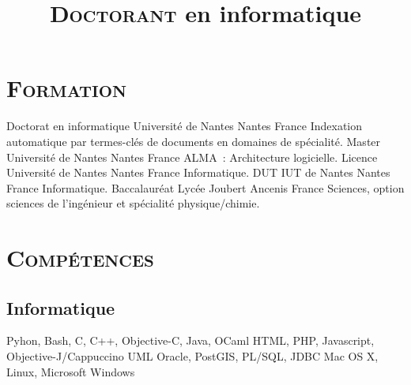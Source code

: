 \documentclass[10pt, a4paper]{moderncv}
\title{\Large{\textsc{Doctorant}} \large{en informatique}}
\begin{document}
  \maketitle

  \section{\textsc{Formation}}
            {Doctorat en informatique}  %
            {Université de Nantes}      %
            {Nantes}                    %
            {France}                    %
            {Indexation automatique par termes-clés de documents en domaines de
            spécialité.}               %
            {Master}
            {Université de Nantes}
            {Nantes}
            {France}
            {ALMA~: Architecture logicielle.}
            {Licence}
            {Université de Nantes}
            {Nantes}
            {France}
            {Informatique.}
            {DUT}
            {IUT de Nantes}
            {Nantes}
            {France}
            {Informatique.}
            {Baccalauréat}
            {Lycée Joubert}
            {Ancenis}
            {France}
            {Sciences, option sciences de l'ingénieur et spécialité
             physique/chimie.}

  \section{\textsc{Compétences}}
    \subsection{Informatique}
             {Pyhon, Bash, C, C++, Objective-C, Java, OCaml}
             {HTML, PHP, Javascript, Objective-J/Cappuccino}
             {UML}
             {Oracle, PostGIS, PL/SQL, JDBC}
             {Mac OS X, Linux, Microsoft Windows}
\end{document}

